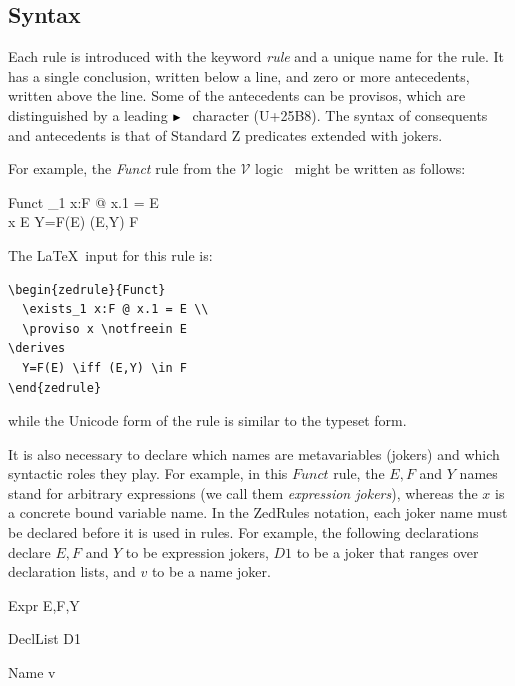 \documentclass{entcs}
\newcommand{\V}{\mathcal{V}}
\begin{document}
\subsection{Syntax}

Each rule is introduced with the keyword \emph{rule} and a unique name
for the rule.  It has a single conclusion, written below a line, and
zero or more antecedents, written above the line.
Some of the antecedents can be provisos,
which are distinguished by a leading $\proviso$ character (U+25B8).
The syntax of
consequents and antecedents is that of Standard Z predicates extended
with jokers.

For example, the \emph{Funct} rule from the $\V$
logic~\cite{brien:calculus-schemas-z00} might be written as follows:
\begin{zedrule}{Funct}
  \exists_1 x:F @ x.1 = E \\
  \proviso x \notfreein E
\derives
  Y=F(E) \iff (E,Y) \in F
\end{zedrule}

The \LaTeX\ input for this rule is:
\begin{verbatim}
\begin{zedrule}{Funct}
  \exists_1 x:F @ x.1 = E \\
  \proviso x \notfreein E
\derives
  Y=F(E) \iff (E,Y) \in F
\end{zedrule}
\end{verbatim}
while the Unicode form of the rule is similar to the typeset form.

It is also necessary to declare which names are metavariables
(jokers) and which syntactic roles they play.  For example, in
this $Funct$ rule, the $E,F$ and $Y$ names stand for arbitrary
expressions (we call them \emph{expression jokers}), whereas the $x$
is a concrete bound variable name.  In the ZedRules notation, each
joker name must be declared before it is used in rules.  For example,
the following declarations declare $E,F$ and $Y$ to be expression
jokers, $D1$ to be a joker that ranges over declaration lists, and
$v$ to be a name joker.

\begin{zedjoker}{Expr} E,F,Y \end{zedjoker}
\begin{zedjoker}{DeclList} D1 \end{zedjoker}
\begin{zedjoker}{Name} v \end{zedjoker}
\end{document}
